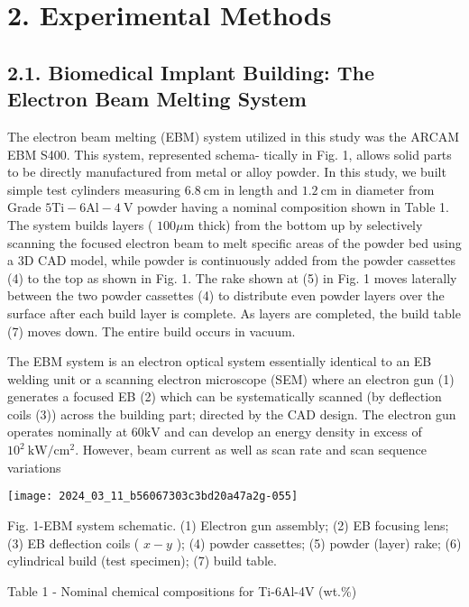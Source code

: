 \documentclass[10pt]{article}
\begin{document}
\section*{2. Experimental Methods}
\subsection*{2.1. Biomedical Implant Building: The Electron Beam Melting System}
The electron beam melting (EBM) system utilized in this study was the ARCAM EBM S400. This system, represented schema- tically in Fig. 1, allows solid parts to be directly manufactured from metal or alloy powder. In this study, we built simple test cylinders measuring $6.8 \mathrm{~cm}$ in length and $1.2 \mathrm{~cm}$ in diameter from Grade $5 \mathrm{Ti}-6 \mathrm{Al}-4 \mathrm{~V}$ powder having a nominal composition shown in Table 1. The system builds layers ( $100 \mu \mathrm{m}$ thick) from the bottom up by selectively scanning the focused electron beam to melt specific areas of the powder bed using a 3D CAD model, while powder is continuously added from the powder cassettes (4) to the top as shown in Fig. 1. The rake shown at (5) in Fig. 1 moves laterally between the two powder cassettes (4) to distribute even powder layers over the surface after each build layer is complete. As layers are completed, the build table (7) moves down. The entire build occurs in vacuum.

The EBM system is an electron optical system essentially identical to an EB welding unit or a scanning electron microscope (SEM) where an electron gun (1) generates a focused EB (2) which can be systematically scanned (by deflection coils (3)) across the building part; directed by the CAD design. The electron gun operates nominally at $60 \mathrm{kV}$ and can develop an energy density in excess of $10^{2} \mathrm{~kW} / \mathrm{cm}^{2}$. However, beam current as well as scan rate and scan sequence variations

\begin{center}
\texttt{[image: 2024\_03\_11\_b56067303c3bd20a47a2g-055]}
\end{center}

Fig. 1-EBM system schematic. (1) Electron gun assembly; (2) EB focusing lens; (3) EB deflection coils ( $x-y$ ); (4) powder cassettes; (5) powder (layer) rake; (6) cylindrical build (test specimen); (7) build table.

Table 1 - Nominal chemical compositions for Ti-6Al-4V (wt.\%)
\end{document}
